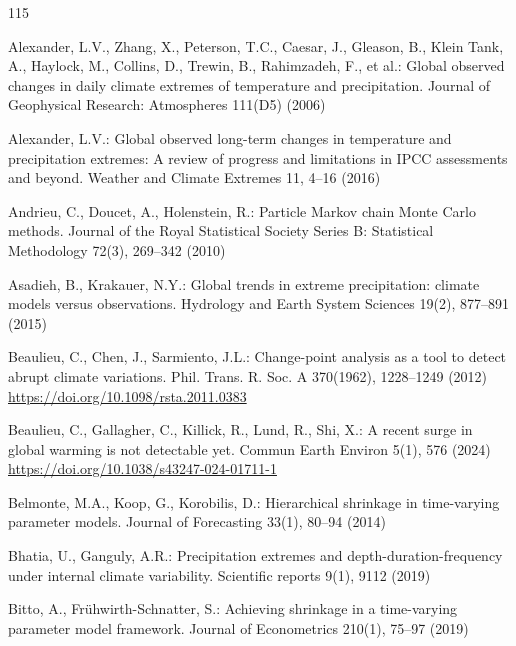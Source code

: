 \documentclass[11pt,a4paper]{article}
\begin{document}
	\begin{thebibliography}{115}
		\small
		\setlength{\itemsep}{2pt}
		
		Alexander, L.V., Zhang, X., Peterson, T.C., Caesar, J., Gleason, B., Klein Tank, A., Haylock, M., Collins, D., Trewin, B., Rahimzadeh, F., et al.: Global observed changes in daily climate extremes of temperature and precipitation. Journal of Geophysical Research: Atmospheres 111(D5) (2006)
		
		Alexander, L.V.: Global observed long-term changes in temperature and precipitation extremes: A review of progress and limitations in IPCC assessments and beyond. Weather and Climate Extremes 11, 4--16 (2016)
		
		Andrieu, C., Doucet, A., Holenstein, R.: Particle Markov chain Monte Carlo methods. Journal of the Royal Statistical Society Series B: Statistical Methodology 72(3), 269--342 (2010)
		
		Asadieh, B., Krakauer, N.Y.: Global trends in extreme precipitation: climate models versus observations. Hydrology and Earth System Sciences 19(2), 877--891 (2015)
		
		Beaulieu, C., Chen, J., Sarmiento, J.L.: Change-point analysis as a tool to detect abrupt climate variations. Phil. Trans. R. Soc. A 370(1962), 1228--1249 (2012) \url{https://doi.org/10.1098/rsta.2011.0383}
		
		Beaulieu, C., Gallagher, C., Killick, R., Lund, R., Shi, X.: A recent surge in global warming is not detectable yet. Commun Earth Environ 5(1), 576 (2024) \url{https://doi.org/10.1038/s43247-024-01711-1}
		
		Belmonte, M.A., Koop, G., Korobilis, D.: Hierarchical shrinkage in time-varying parameter models. Journal of Forecasting 33(1), 80--94 (2014)
		
		Bhatia, U., Ganguly, A.R.: Precipitation extremes and depth-duration-frequency under internal climate variability. Scientific reports 9(1), 9112 (2019)
		
		Bitto, A., Frühwirth-Schnatter, S.: Achieving shrinkage in a time-varying parameter model framework. Journal of Econometrics 210(1), 75--97 (2019)
		

\end{thebibliography}
\end{document}
